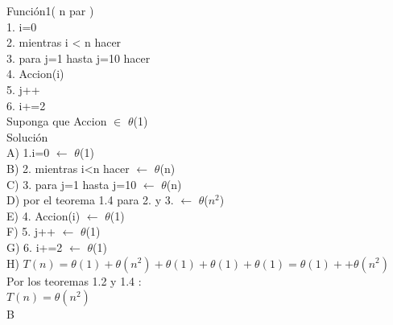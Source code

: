 \documentclass[spanish]{article}
\begin{document}
	Función1( n par )\\
	1. i=0\\
	2. mientras i < n hacer\\
	3. \hspace{0.5cm} para j=1 hasta j=10 hacer\\
	4. \hspace{1.0cm} Accion(i) \\
	5. 	\hspace{1.0cm} j++\\
	6. i+=2\\
	Suponga que Accion $\in$  $\theta$(1)\\
	\bigskip
	Solución\\
	A) 1.i=0 $\leftarrow$ $\theta$(1)\\
	B) 2. mientras i<n hacer $\leftarrow$ $\theta$(n)\\
	C) 3.\hspace{0.5cm} para j=1 hasta j=10 $\leftarrow$ $\theta$(n)\\
	D) por el teorema 1.4 para 2. y 3. $\leftarrow$ $\theta$($n^{2}$)\\
	E) 4.\hspace{1.0cm} Accion(i) $\leftarrow$ $\theta$(1)\\
	F) 5.\hspace{1.0cm} j++  $\leftarrow$ $\theta$(1)\\
	G) 6. i+=2 $\leftarrow$ $\theta$(1)\\
	H) $T(n) = \theta(1) + \theta(n^{2})  + \theta(1) + \theta(1) + \theta(1)
		= \theta(1) + + \theta(n^{2}) $\\
		Por los teoremas 1.2 y 1.4 :\\
		$T(n) = \theta(n^{2})$ \\
	

\newpage
	{\large{B}}\\
\end{document}
